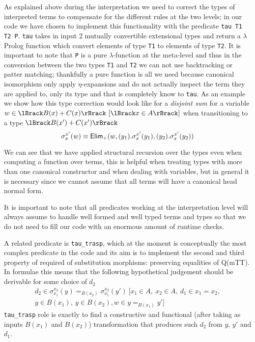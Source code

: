 	As explained above during the interpretation we need to correct the types of interpreted terms to compensate for the different rules at the two levels; in our code we have chosen to implement this functionality with the predicate \verb|tau T1 T2 P|. \verb|tau| takes in input 2 mutually convertible extensional types and return a $\lambda$Prolog function which convert elements of type \verb|T1| to elements of type \verb|T2|. It is important to note that \verb|P| is a pure $\lambda$-function at the meta-level and thus in the conversion between the two types \verb|T1| and \verb|T2| we can not use backtracking or patter matching; thankfully a pure function is all we need because canonical isomorphism only apply $\eta$-expansions and do not actually inspect the term they are applied to, only its type and that is completely know to \verb|tau|. As an example we show how this type correction would look like for a \emph{disjoint sum} for a variable $w \in \trad{B(x)+C(x)} \ [\trad{x \in A}]$ when transitioning to a type $\trad{B(x')+C(x')}$  \[\sigma_{x}^{x'}(w) \equiv {\text{\ensuremath{\mathsf{Elim}}}}_+(w, (y_1).\sigma_{x}^{x'}(y_1), (y_2).\sigma_{x}^{x'}(y_2))\]
	 
	We can see that we have applied structural recursion over the types even when computing a function over terms, this is helpful when treating types with more than one canonical constructor and  when dealing with variables, but in general it is necessary since we cannot assume that all terms will have a canonical head normal form.

	It is important to note that all predicates working at the interpretation level will always assume to handle well formed and well typed terms and types so that we do not need to fill our code with an enormous amount of runtime checks.
		
	A related predicate is \verb|tau_trasp|, which at the moment is conceptually the most complex predicate in the code and its aim is to implement the second and third property of required of substitution morphisms: preserving equalities of Q(mTT). In formulae this means that the following hypothetical judgement should be derivable for some choice of $d_2$ 
	\begin{multline}
	d_2 \in \sigma_{x_1}^{x_2}(y) =_{B(x_2)} \sigma_{x_1}^{x_2}(y') \ [x_1 \in A,\ x_2 \in A,\ d_1 \in x_1 = x_2,\\ y\in B(x_1),\ y\in B(x_2), w\in y =_{B(x_1)} y']\end{multline}
	\verb|tau_trasp| role is exactly to find a constructive and functional (after taking as inputs $B(x_1)$ and $B(x_2)$) transformation that produces such $d_2$ from $y$, $y'$ and $d_1$.
	
